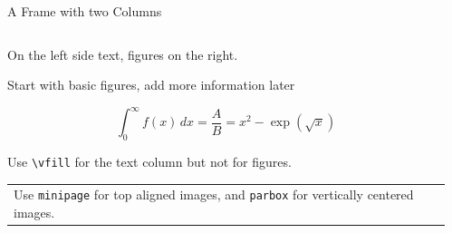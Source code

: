
\begin{frame}{A Frame with two Columns}
  \begin{columns}
    \begin{column}{.45\textwidth}
      \minipage[c][0.65\textheight][s]{\columnwidth}
      
      On the left side text, figures on the right.

      \vfill


      Start with basic figures, add more information later

      \vfill
      \[\int_{0}^\infty f(x)\, dx = \frac{A}{B} = x^2 - \exp(\sqrt{x}) \]

      \vfill


      Use \texttt{\textbackslash vfill} for the text column but not
      for figures.
 
      \vfill
      
      \begin{tabular}{|p{}}
        Use \texttt{minipage} for top aligned images, and
        \texttt{parbox} for vertically centered images.
      \end{tabular}

      
      \endminipage      
    \end{column}
    \begin{column}{.55\textwidth}


      
    \end{column}
  \end{columns}

\end{frame}
